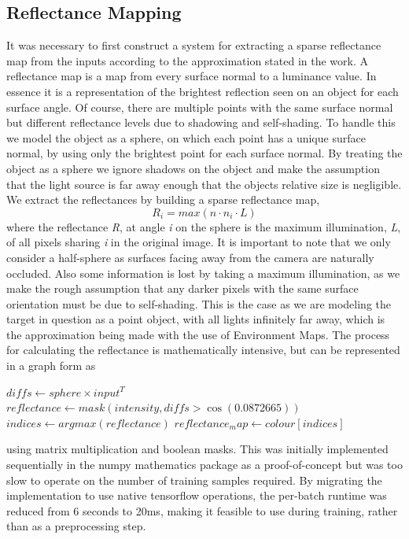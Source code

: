 \documentclass[ %
                    author={Gavin Parker},
                supervisor={Dr. Neill Campbell},
                    degree={MEng},
                     title={Deep Learning for Illumination Estimation from Stereo Images},
                  subtitle={},
                      type={Research},
                      year={2018} ]{dissertation}
\begin{document}
\subsection{Reflectance Mapping}
It was necessary to first construct a system for extracting a sparse reflectance map from the inputs according to the approximation stated in the work. A reflectance map is a map from every surface normal to a luminance value. In essence it is a representation of the brightest reflection seen on an object for each surface angle. Of course, there are multiple points with the same surface normal but different reflectance levels due to shadowing and self-shading. To handle this we model the object as a sphere, on which each point has a unique surface normal, by using only the brightest point for each surface normal. By treating the object as a sphere we ignore shadows on the object and make the assumption that the light source is far away enough that the objects relative size is negligible. We extract the reflectances by building a sparse reflectance map,
\[ R_i = max(n\cdot n_i \cdot L)\]
where the reflectance \textit{R}, at angle \textit{i} on the sphere is the maximum illumination, \textit{L}, of all pixels sharing \textit{i} in the original image. It is important to note that we only consider a half-sphere as surfaces facing away from the camera are naturally occluded. Also some information is lost by taking a maximum illumination, as we make the rough assumption that any darker pixels with the same surface orientation must be due to self-shading. This is the case as we are modeling the target in question as a point object, with all lights infinitely far away, which is the approximation being made with the use of Environment Maps.
\newline
The process for calculating the reflectance is mathematically intensive, but can be represented in a graph form as
\begin{algorithm}
$ diffs \leftarrow sphere \times input^T $\;
$ reflectance \leftarrow mask(intensity, diffs > \cos(0.0872665)) $\;
$ indices \leftarrow argmax(reflectance) $\;
$ reflectance_map \leftarrow colour[indices] $\;
\end{algorithm}
using matrix multiplication and boolean masks. This was initially implemented sequentially in the numpy mathematics package as a proof-of-concept but was too slow to operate on the number of training samples required. By migrating the implementation to use native tensorflow operations, the per-batch runtime was reduced from 6 seconds to 20ms, making it feasible to use during training, rather than as a preprocessing step.
\end{document}
